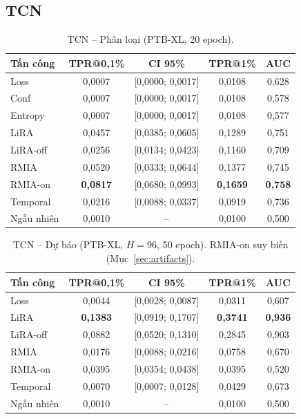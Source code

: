 \documentclass[12pt,a4paper]{report}
\begin{document}
\subsection{TCN}

\begin{table}[H]
\centering
\caption{TCN -- Phân loại (PTB-XL, 20 epoch).}
\label{tab:tcn_cls}
\begin{tabular}{lcccc}
\toprule
\textbf{Tấn công} & \textbf{TPR@0,1\%} & \textbf{CI 95\%} & \textbf{TPR@1\%} & \textbf{AUC} \\
\midrule
Loss      & 0,0007 & [0,0000; 0,0017] & 0,0108 & 0,628 \\
Conf      & 0,0007 & [0,0000; 0,0017] & 0,0108 & 0,578 \\
Entropy   & 0,0007 & [0,0000; 0,0017] & 0,0108 & 0,577 \\
LiRA      & 0,0457 & [0,0385; 0,0605] & 0,1289 & 0,751 \\
LiRA-off  & 0,0256 & [0,0134; 0,0423] & 0,1160 & 0,709 \\
RMIA      & 0,0520 & [0,0333; 0,0644] & 0,1377 & 0,745 \\
RMIA-on   & \textbf{0,0817} & [0,0680; 0,0993] & \textbf{0,1659} & \textbf{0,758} \\
Temporal  & 0,0216 & [0,0088; 0,0337] & 0,0919 & 0,736 \\
\midrule
Ngẫu nhiên & 0,0010 & -- & 0,0100 & 0,500 \\
\bottomrule
\end{tabular}
\end{table}

\begin{table}[H]
\centering
\caption{TCN -- Dự báo (PTB-XL, $H = 96$, 50 epoch). RMIA-on suy biến (Mục~\ref{sec:artifacts}).}
\label{tab:tcn_fcst}
\begin{tabular}{lcccc}
\toprule
\textbf{Tấn công} & \textbf{TPR@0,1\%} & \textbf{CI 95\%} & \textbf{TPR@1\%} & \textbf{AUC} \\
\midrule
Loss      & 0,0044 & [0,0028; 0,0087] & 0,0311 & 0,607 \\
LiRA      & \textbf{0,1383} & [0,0919; 0,1707] & \textbf{0,3741} & \textbf{0,936} \\
LiRA-off  & 0,0882 & [0,0520; 0,1310] & 0,2845 & 0,903 \\
RMIA      & 0,0176 & [0,0088; 0,0216] & 0,0758 & 0,670 \\
RMIA-on   & 0,0395 & [0,0354; 0,0438] & 0,0395 & 0,520 \\
Temporal  & 0,0070 & [0,0007; 0,0128] & 0,0429 & 0,673 \\
\midrule
Ngẫu nhiên & 0,0010 & -- & 0,0100 & 0,500 \\
\bottomrule
\end{tabular}
\end{table}
\end{document}
